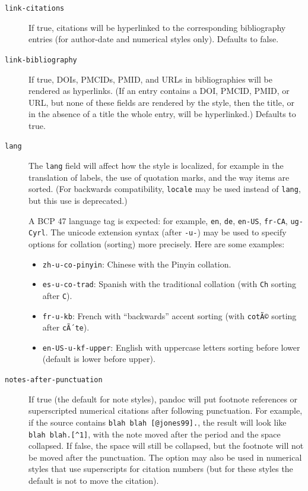 \documentclass[
]{article}
\providecommand{\tightlist}{%
  \setlength{\itemsep}{0pt}\setlength{\parskip}{0pt}}
\begin{document}
\begin{description}
\item[\texttt{link-citations}]
If true, citations will be hyperlinked to the corresponding bibliography
entries (for author-date and numerical styles only). Defaults to false.
\item[\texttt{link-bibliography}]
If true, DOIs, PMCIDs, PMID, and URLs in bibliographies will be rendered
as hyperlinks. (If an entry contains a DOI, PMCID, PMID, or URL, but
none of these fields are rendered by the style, then the title, or in
the absence of a title the whole entry, will be hyperlinked.) Defaults
to true.
\item[\texttt{lang}]
The \texttt{lang} field will affect how the style is localized, for
example in the translation of labels, the use of quotation marks, and
the way items are sorted. (For backwards compatibility, \texttt{locale}
may be used instead of \texttt{lang}, but this use is deprecated.)

A BCP 47 language tag is expected: for example, \texttt{en},
\texttt{de}, \texttt{en-US}, \texttt{fr-CA}, \texttt{ug-Cyrl}. The
unicode extension syntax (after \texttt{-u-}) may be used to specify
options for collation (sorting) more precisely. Here are some examples:

\begin{itemize}
\tightlist
\item
  \texttt{zh-u-co-pinyin}: Chinese with the Pinyin collation.
\item
  \texttt{es-u-co-trad}: Spanish with the traditional collation (with
  \texttt{Ch} sorting after \texttt{C}).
\item
  \texttt{fr-u-kb}: French with ``backwards'' accent sorting (with
  \texttt{cotÃ©} sorting after \texttt{cÃ´te}).
\item
  \texttt{en-US-u-kf-upper}: English with uppercase letters sorting
  before lower (default is lower before upper).
\end{itemize}
\item[\texttt{notes-after-punctuation}]
If true (the default for note styles), pandoc will put footnote
references or superscripted numerical citations after following
punctuation. For example, if the source contains
\texttt{blah\ blah\ {[}@jones99{]}.}, the result will look like
\texttt{blah\ blah.{[}\^{}1{]}}, with the note moved after the period
and the space collapsed. If false, the space will still be collapsed,
but the footnote will not be moved after the punctuation. The option may
also be used in numerical styles that use superscripts for citation
numbers (but for these styles the default is not to move the citation).
\end{description}
\end{document}
